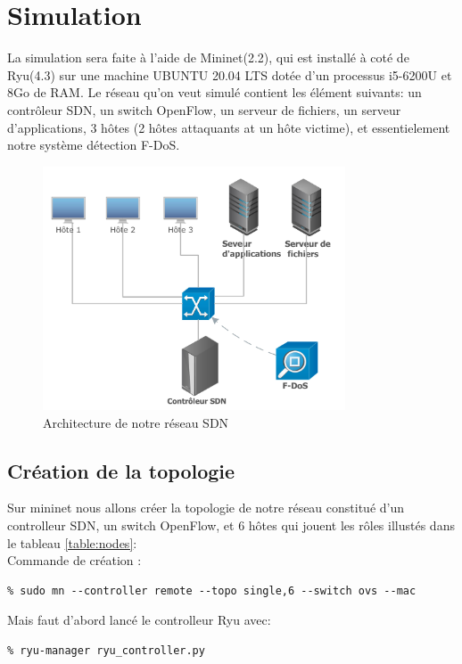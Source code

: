 \section{Simulation}
La simulation sera faite à l'aide de Mininet(2.2), qui est installé à coté de Ryu(4.3) sur une machine UBUNTU 20.04 LTS dotée d'un processus i5-6200U et 8Go de RAM. Le réseau qu'on veut simulé contient les élément suivants: un contrôleur SDN, un switch OpenFlow, un serveur de fichiers, un serveur d'applications, 3 hôtes (2 hôtes attaquants at un hôte victime), et essentielement notre système détection F-DoS.
\begin{figure}[h]
\centering
\includegraphics[width=0.8\textwidth]{Figures/simulation}
\decoRule
\caption{Architecture de notre réseau SDN}
\label{fig:architecture}
\end{figure} 

\subsection{Création de la topologie}
Sur mininet nous allons créer la topologie de notre réseau constitué d'un controlleur SDN, un switch OpenFlow, et 6 hôtes qui jouent les rôles illustés dans le tableau \ref{table:nodes}:\\

\noindent Commande de création :
\begin{verbatim}
% sudo mn --controller remote --topo single,6 --switch ovs --mac
\end{verbatim}
Mais faut d'abord lancé le controlleur Ryu avec:
\begin{verbatim}
% ryu-manager ryu_controller.py 
\end{verbatim}

